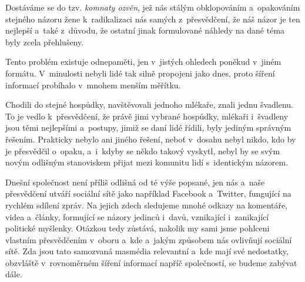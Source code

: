 \documentclass[12pt, a4paper]{article}
\numberwithin{equation}{section} 	%
\begin{document}
Dostáváme se do tzv. \textit{komnaty ozvěn}, jež nás stálým obklopováním a~opakováním stejného názoru žene k radikalizaci nás samých z přesvědčení, že náš názor je ten nejlepší a~také z důvodu, že ostatní jinak formulované náhledy na dané téma byly zcela přehlušeny.

Tento problém existuje odnepaměti, jen v jistých ohledech poněkud v jiném formátu. V minulosti nebyli lidé tak silně propojeni jako dnes, proto šíření informací probíhalo v mnohem menším měřítku.

Chodili do stejné hospůdky, navštěvovali jednoho mlékaře, znali jednu švadlenu. To je vedlo k přesvědčení, že právě jimi vybrané hospůdky, mlékaři i~švadleny jsou těmi nejlepšími a~postupy, jimiž se daní lidé řídili, byly jediným správným řešením. Prakticky nebylo ani jiného řešení, neboť v dosahu nebyl nikdo, kdo by je přesvědčil o~opaku, a~i~kdyby se někdo takový vyskytl, nebyl by se svým novým odlišným stanoviskem přijat mezi komunitu lidí s identickým názorem.

Dnešní společnost není příliš odlišná od té výše popsané, jen nás a~naše přesvědčení utváří sociální sítě jako například Facebook a~Twitter, fungující na rychlém sdílení zpráv.  Na jejich zdech sledujeme mnohé odkazy na komentáře, videa a~články, formující se názory jedinců i~davů, vznikající i~zanikající politické myšlenky. Otázkou tedy zůstává, nakolik my sami jsme pohlceni vlastním přesvědčením v oboru a~kde a~jakým způsobem nás ovlivňují sociální sítě.  Zda jsou tato samozvaná masmédia relevantní a~kde mají své nedostatky, obzvláště v rovnoměrném šíření informací napříč společností, se budeme zabývat dále.
\end{document}
